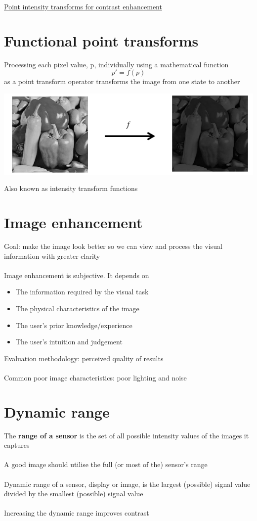 \documentclass{article}[18pt]
\begin{document}
\begin{center}
\underline{\huge Point intensity transforms for contrast enhancement}
\end{center}
\section{Functional point transforms}
Processing each pixel value, p, individually using a mathematical function
$$p'=f(p)$$
as a point transform operator transforms the image from one state to another
\begin{center}
	\includegraphics[scale=0.7]{functional}
\end{center}
Also known as intensity transform functions
\section{Image enhancement}
Goal: make the image look better so we can view and process the visual information with greater clarity\\
\\
Image enhancement is subjective. It depends on
\begin{itemize}
	\item The information required by the visual task
	\item The physical characteristics of the image
	\item The user's prior knowledge/experience
	\item The user's intuition and judgement
\end{itemize}
Evaluation methodology: perceived quality of results\\
\\
Common poor image characteristics: poor lighting and noise
\section{Dynamic range}
The \textbf{range of a sensor} is the set of all possible intensity values of the images it captures\\
\\
A good image should utilise the full (or most of the) sensor's range\\
\\
Dynamic range of a sensor, display or image, is the largest (possible) signal value divided by the smallest (possible) signal value\\
\\
Increasing the dynamic range improves contrast
\end{document}
